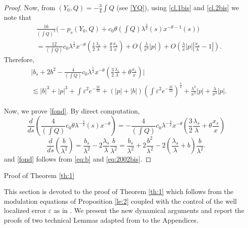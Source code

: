 \documentclass[11pt,a4paper,reqno]{amsart}
\makeatletter
\theoremstyle{remark}
\numberwithin{equation}{section}
\def\section{\@startsection{section}{1}%
  \z@{1.5\linespacing\@plus\linespacing}{.5\linespacing}%
  {\normalfont\bfseries\large\centering}}
\def\e{\varepsilon}
\def\lsl{\frac{\lambda_s}{\lambda}}
\def\l{\lambda}
\def\lsl{\frac{\lambda_s}{\lambda}}
\def\xsl{\frac{x_s}{\lambda}}
\def\Yz{Y_0}
\makeatother
\begin{document}
\begin{proof}
\medskip

Now, from $(\Yz,Q) =- \frac 34 \int Q$ (see   \eqref{YQ}),
  using \eqref{cl.1bis} and \eqref{cl.2bis} we note that 
\begin{align}
& \frac {16}{(\int Q)^2} \bigg( -  p_s (\Yz,Q)+ c_0 \theta \left(\int Q\right) \l^{\frac 32}(s) x^{-\theta-1}(s) \bigg)\nonumber \\
& =   \frac {12}{(\int Q)} c_0 \l^{\frac 12} x^{-\theta}  \left(  \frac 12 \lsl 
 +\frac \theta 3    \frac {x_s}{x}    \right) +O\left(\frac {\l}{x^{3}}| p|\right)  + O\left( \frac {\l}{x} |p| \left|\xsl-1\right|\right).
    \label{pascancel}
\end{align}
Therefore, 
\begin{align}
&\bigg| b_s + 2b^2 - \frac {4}{(\int Q)} c_0 \l^{\frac 12} x^{-\theta}  \left(  \frac 32 \lsl 
 +  \theta     \frac {x_s}{x}    \right)   \bigg| \nonumber \\
& \lesssim  |b|^3 +|p|^3 + \int \varepsilon^2 {e^{-\frac{|y|}{10}}} 
+ (|p|+|b|) \left(\int \varepsilon^2 {e^{-\frac{|y|}{10}}} \right)^{\frac 12} +
\frac {\l^2}{x^2} |p| + \frac {\l}{x^3} |p|
.\label{eq:b}
\end{align}
 

Now, we prove \eqref{fond}. By direct computation,
$$
\frac d{ds}\left( \frac 4{\left(\int Q\right)}c_0 \theta   \l^{-\frac 32}(s) x^{-\theta}\right) = - \frac {4}{(\int Q)} c_0 \l^{-\frac 32} x^{-\theta}  \left(  \frac 32 \lsl 
 +  \theta     \frac {x_s}{x}    \right)  
$$
$$
\frac d{ds}\left( \frac b{\l^2}\right)
 =   \frac {b_s}{\l^2} - 2 \lsl \frac b{\l^2}
 =   \frac {b_s}{\l^2}  + 2 \frac {b^2}{\l^2} - 2 \left( \lsl +b\right) \frac b{\l^2}.$$
 and \eqref{fond} follows from \eqref{eq:b} and \eqref{eq:2002bis}.
  \end{proof}
 
 
  
 
\section{Proof of Theorem \ref{th:1}}



This section is devoted to the proof of Theorem \ref{th:1} which follows from the modulation equations of Proposition \ref{le:2} coupled with the control of the well localized error $\e$ as in \cite{MMR1}. We present the   new dynamical arguments and report the proofs of  two technical Lemmas adapted from \cite{MMR1} to the Appendices.
\end{document}

